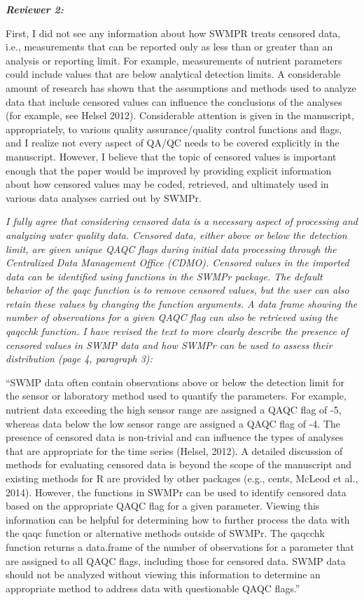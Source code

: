 \documentclass[letterpaper,12pt]{article}\usepackage[]{graphicx}\usepackage[]{color}
\newcommand{\Bigtxt}[1]{\textbf{\textit{#1}}}
\begin{document}
\Bigtxt{Reviewer 2:}

First, I did not see any information about how SWMPR treats censored data, i.e., measurements that can be reported only as less than or greater than an analysis or reporting limit. For example, measurements of nutrient parameters could include values that are below analytical detection limits. A considerable amount of research has shown that the assumptions and methods used to analyze data that include censored values can influence the conclusions of the analyses (for example, see Helsel 2012). Considerable attention is given in the manuscript, appropriately, to various quality assurance/quality control functions and flags, and I realize not every aspect of QA/QC needs to be covered explicitly in the manuscript. However, I believe that the topic of censored values is important enough that the paper would be improved by providing explicit information about how censored values may be coded, retrieved, and ultimately used in various data analyses carried out by SWMPr.

{\it I fully agree that considering censored data is a necessary aspect of processing and analyzing water quality data.  Censored data, either above or below the detection limit, are given unique QAQC flags during initial data processing through the Centralized Data Management Office (CDMO).  Censored values in the imported data can be identified using functions in the SWMPr package.  The default behavior of the qaqc function is to remove censored values, but the user can also retain these values by changing the function arguments.  A data frame showing the number of observations for a given QAQC flag can also be retrieved using the qaqcchk function.  I have revised the text to more clearly describe the presence of censored values in SWMP data and how SWMPr can be used to assess their distribution (page 4, paragraph 3): 

``SWMP data often contain observations above or below the detection limit for the sensor or laboratory method used to quantify the parameters.  For example, nutrient data exceeding the high sensor range are assigned a QAQC flag of -5, whereas data below the low sensor range are assigned a QAQC flag of -4.  The presence of censored data is non-trivial and can influence the types of analyses that are appropriate for the time series (Helsel, 2012).  A detailed discussion of methods for evaluating censored data is beyond the scope of the manuscript and existing methods for R are provided by other packages (e.g., cents, McLeod et al., 2014).  However, the functions in SWMPr can be used to identify censored data based on the appropriate QAQC flag for a given parameter.  Viewing this information can be helpful for determining how to further process the data with the qaqc function or alternative methods outside of SWMPr.  The qaqcchk function returns a data.frame of the number of observations for a parameter that are assigned to all QAQC flags, including those for censored data.  SWMP data should not be analyzed without viewing this information to determine an appropriate method to address data with questionable QAQC flags.''
}
\end{document}
